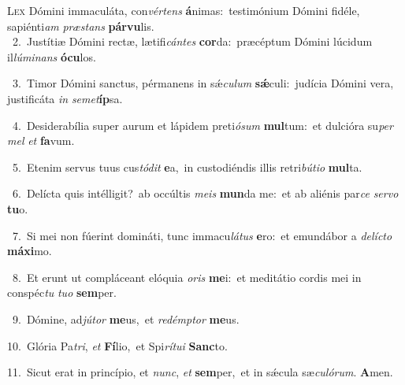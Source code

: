 \lettrine{\initial\textcolor{\initialcolor}{L}}{ex} Dómini immaculáta, con\-\textit{vér}\-\textit{tens} \textbf{á}\-nimas:~\star testimónium Dómini fidéle, sapiénti\textit{am} \textit{præ}\-\textit{stans} \textbf{pár}\-\textbf{vu}lis.\\
{\numbfont\textcolor{\numbcolor}{~2.}}~Justítiæ Dómini rectæ, lætifi\-\textit{cán}\-\textit{tes} \textbf{cor}\-da:~\star præcéptum Dómini lúcidum il\-\textit{lú}\-\textit{mi}\textit{nans} \textbf{ó}\-\textbf{cu}los.\par
{\numbfont\textcolor{\numbcolor}{~3.}}~Timor Dómini sanctus, pérmanens in sǽ\-\textit{cu}\-\textit{lum} \textbf{sǽ}\-culi:~\star judícia Dómini vera, justificáta \textit{in} \textit{se}\-\textit{met}\textbf{íp}sa.\par
{\numbfont\textcolor{\numbcolor}{~4.}}~Desiderabília super aurum et lápidem preti\-\textit{ó}\-\textit{sum} \textbf{mul}\-tum:~\star et dulcióra su\textit{per} \textit{mel} \textit{et} \textbf{fa}\-vum.\par
{\numbfont\textcolor{\numbcolor}{~5.}}~Etenim servus tuus cus\-\textit{tó}\-\textit{dit} \textbf{e}\-a,~\star in custodiéndis illis retri\-\textit{bú}\-\textit{ti}\textit{o} \textbf{mul}\-ta.\par
{\numbfont\textcolor{\numbcolor}{~6.}}~Delícta quis intélligit?~\dagger ab occúltis \textit{me}\-\textit{is} \textbf{mun}\-da me:~\star et ab aliénis par\textit{ce} \textit{ser}\-\textit{vo} \textbf{tu}\-o.\par
{\numbfont\textcolor{\numbcolor}{~7.}}~Si mei non fúerint domináti, tunc immacu\-\textit{lá}\-\textit{tus} \textbf{e}\-ro:~\star et emundábor a \textit{de}\-\textit{líc}\textit{to} \textbf{má}\-\textbf{xi}mo.\par
{\numbfont\textcolor{\numbcolor}{~8.}}~Et erunt ut compláceant elóquia \textit{o}\-\textit{ris} \textbf{me}\-i:~\star et meditátio cordis mei in conspéc\textit{tu} \textit{tu}\-\textit{o} \textbf{sem}\-per.\par
{\numbfont\textcolor{\numbcolor}{~9.}}~Dómine, ad\-\textit{jú}\-\textit{tor} \textbf{me}\-us,~\star et \textit{red}\-\textit{émp}\textit{tor} \textbf{me}\-us.\par
{\numbfont\textcolor{\numbcolor}{10.}}~Glória Pa\-\textit{tri}\-, \textit{et} \textbf{Fí}\-lio,~\star et Spi\-\textit{rí}\-\textit{tu}\textit{i} \textbf{Sanc}\-to.\par
{\numbfont\textcolor{\numbcolor}{11.}}~Sicut erat in princípio, et \textit{nunc}\-, \textit{et} \textbf{sem}\-per,~\star et in sǽcula sæ\-\textit{cu}\-\textit{ló}\textit{rum}. \textbf{A}\-men.\par
